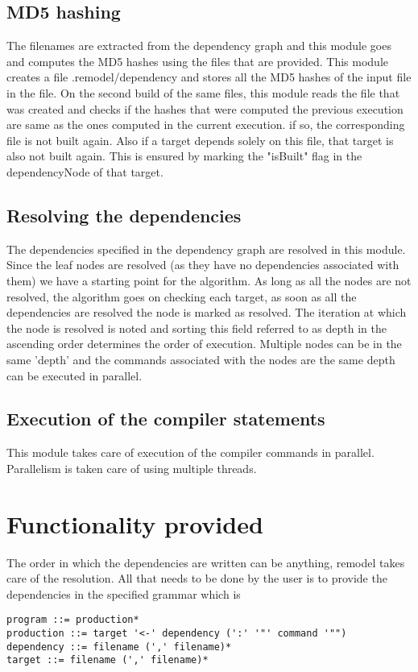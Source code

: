 \documentclass[a4paper, 12pt, notitlepage]{report}
\begin{document}
\subsection{MD5 hashing}
The filenames are extracted from the dependency graph and this module goes and computes the MD5 hashes using the files that are provided. This module creates a file .remodel/dependency and stores all the MD5 hashes of the input file in the file. On the second build of the same files, this module reads the file that was created and checks if the hashes that were computed the previous execution are same as the ones computed in the current execution. if so, the corresponding file is not built again. Also if a target depends solely on this file, that target is also not built again. This is ensured by marking the "isBuilt" flag in the dependencyNode of that target.

\subsection{Resolving the dependencies}
The dependencies specified in the dependency graph are resolved in this module. Since the leaf nodes are resolved (as they have no dependencies associated with them) we have a starting point for the algorithm. As long as all the nodes are not resolved, the algorithm goes on checking each target, as soon as all the dependencies are resolved the node is marked as resolved. The iteration at which the node is resolved is noted and sorting this field referred to as depth in the ascending order determines the order of execution. Multiple nodes can be in the same 'depth' and the commands associated with the nodes are the same depth can be executed in parallel.

\subsection{Execution of the compiler statements}
This module takes care of execution of the compiler commands in parallel. Parallelism is taken care of using multiple threads. 

\section{Functionality provided}
The order in which the dependencies are written can be anything, remodel takes care of the resolution. All that needs to be done by the user is to provide the dependencies in the specified grammar which is
\begin{verbatim}
program ::= production*
production ::= target '<-' dependency (':' '"' command '"")
dependency ::= filename (',' filename)*
target ::= filename (',' filename)*
\end{verbatim}
\end{document}
